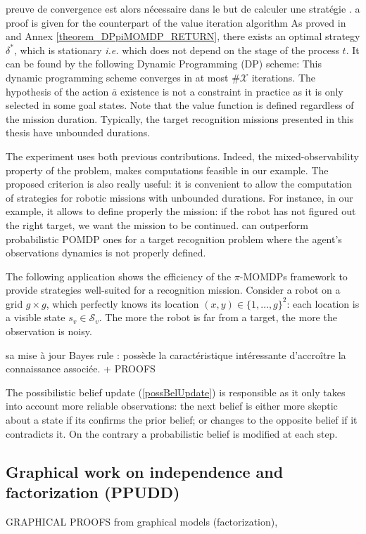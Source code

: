 preuve de convergence est alors n\'ecessaire 
dans le but de calculer une strat\'egie \cite{Drougard13}. 
a proof is given for the counterpart of the value iteration algorithm
As proved in \cite{Drougard13} and Annex \ref{theorem_DPpiMOMDP_RETURN}, 
there exists an optimal strategy $\delta^{\ast}$, 
which is stationary \textit{i.e.} 
which does not depend on the stage of the process $t$. 
It can be found by the following Dynamic Programming (DP) scheme: 
This dynamic programming scheme converges in at most 
$\# \mathcal{X}$ iterations.
The hypothesis of the action $\overline{a}$ existence
is not a constraint in practice
as it is only selected in some goal states.
Note that the value function is defined regardless of the mission duration.
Typically, the target recognition missions presented in this thesis 
have unbounded durations.

The experiment uses both previous contributions.
Indeed, the mixed-observability property of the problem,
makes computations feasible in our example.
The proposed criterion is also really useful: 
it is convenient to allow the computation of strategies 
for robotic missions with unbounded durations.
For instance, in our example, 
it allows to define properly the mission: 
if the robot has not figured out the right target,
we want the mission to be continued.
can outperform probabilistic POMDP ones 
for a target recognition problem 
where the agent's observations dynamics 
is not properly defined.

The following application shows the efficiency 
of the $\pi$-MOMDPs framework to provide strategies
well-suited for a recognition mission. 
Consider a robot on a grid $g \times g$, 
which perfectly knows its location $(x,y) \in \{ 1, \ldots, g \}^2$:
each location is a visible state $s_v \in \mathcal{S}_v$. 
The more the robot is far from a target, 
the more the observation is noisy. 

sa mise \`a jour Bayes rule \cite{Dubois199023}: 
poss\`ede la caract\'eristique int\'eressante d'accro\^itre la connaissance associ\'ee.
+ PROOFS

The possibilistic belief update (\ref{possBelUpdate})
is responsible as it only takes into account 
more reliable observations:
the next belief is either more skeptic 
about a state if its confirms the prior belief; 
or changes to the opposite belief if it contradicts it.
On the contrary a probabilistic belief is modified at each step. 


\subsection*{Graphical work on independence and factorization (PPUDD)}
GRAPHICAL PROOFS from graphical models (factorization),

